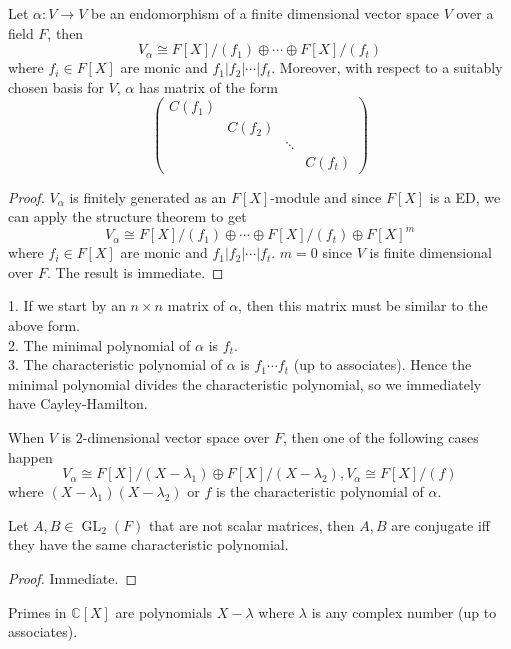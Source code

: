 \begin{theorem}
    Let $\alpha:V\to V$ be an endomorphism of a finite dimensional vector space $V$ over a field $F$, then
    $$V_\alpha\cong F[X]/(f_1)\oplus\cdots\oplus F[X]/(f_t)$$
    where $f_i\in F[X]$ are monic and $f_1|f_2|\cdots|f_t$.
    Moreover, with respect to a suitably chosen basis for $V$, $\alpha$ has matrix of the form
    $$\begin{pmatrix}
        C(f_1)&&&\\
        &C(f_2)&&\\
        &&\ddots&\\
        &&&C(f_t)
    \end{pmatrix}$$
\end{theorem}
\begin{proof}
    $V_\alpha$ is finitely generated as an $F[X]$-module and since $F[X]$ is a ED, we can apply the structure theorem to get
    $$V_\alpha\cong F[X]/(f_1)\oplus\cdots\oplus F[X]/(f_t)\oplus F[X]^m$$
    where $f_i\in F[X]$ are monic and $f_1|f_2|\cdots|f_t$.
    $m=0$ since $V$ is finite dimensional over $F$.
    The result is immediate.
\end{proof}
\begin{remark}
    1. If we start by an $n\times n$ matrix of $\alpha$, then this matrix must be similar to the above form.\\
    2. The minimal polynomial of $\alpha$ is $f_t$.\\
    3. The characteristic polynomial of $\alpha$ is $f_1\cdots f_t$ (up to associates).
    Hence the minimal polynomial divides the characteristic polynomial, so we immediately have Cayley-Hamilton.
\end{remark}
\begin{example}
    When $V$ is $2$-dimensional vector space over $F$, then one of the following cases happen
    $$V_\alpha\cong F[X]/(X-\lambda_1)\oplus F[X]/(X-\lambda_2),V_\alpha\cong F[X]/(f)$$
    where $(X-\lambda_1)(X-\lambda_2)$ or $f$ is the characteristic polynomial of $\alpha$.
\end{example}
\begin{corollary}
    Let $A,B\in\operatorname{GL}_2(F)$ that are not scalar matrices, then $A,B$ are conjugate iff they have the same characteristic polynomial.
\end{corollary}
\begin{proof}
    Immediate.
\end{proof}
\begin{lemma}
    Primes in $\mathbb C[X]$ are polynomials $X-\lambda$ where $\lambda$ is any complex number (up to associates).
\end{lemma}
